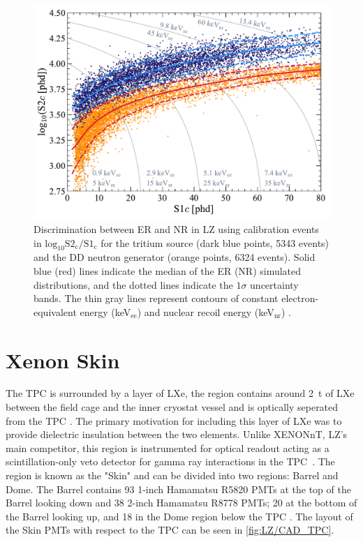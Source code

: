\begin{figure}[!ht]
    \centering
    \includegraphics[width=0.7\linewidth]{figures/LZ/SR1WS_calOnly_0629.pdf}
    \caption[Discrimination between ER and NR in LZ using calibration events.]{Discrimination between ER and NR in LZ using calibration events in $\text{log}_{10}\text{S2}_{\text{c}}/\text{S1}_{\text{c}}$ for the tritium source (dark blue points, 5343 events) and the DD neutron generator (orange points, 6324 events). Solid blue (red) lines indicate the median of the ER (NR) simulated distributions, and the dotted lines indicate the $1\sigma$ uncertainty bands. The thin gray lines represent contours of constant electron-equivalent energy (keV$_{\text{ee}}$) and nuclear recoil energy (keV$_{\text{nr}}$) \cite{LZ:2022lsv}.}
    \label{fig:LZ/NRERBandExample}
\end{figure}

\section{Xenon Skin}\label{sec:LZ/Skin}
The TPC is surrounded by a layer of LXe, the region contains around 2~t of LXe between the field cage and the inner cryostat vessel and is optically seperated from the TPC \cite{LZNIMA}. The primary motivation for including this layer of LXe was to provide dielectric insulation between the two elements. Unlike XENONnT, LZ's main competitor, this region is instrumented for optical readout acting as a scintillation-only veto detector for gamma ray interactions in the TPC~\cite{XENON:2024wpa}. The region is known as the "Skin" and can be divided into two regions: Barrel and Dome. The Barrel contains 93 1-inch Hamamatsu R5820 PMTs at the top of the Barrel looking down and 38 2-inch Hamamatsu R8778 PMTs; 20 at the bottom of the Barrel looking up, and 18 in the Dome region below the TPC \cite{LZNIMA}. The layout of the Skin PMTs with respect to the TPC can be seen in \autoref{fig:LZ/CAD_TPC}.

